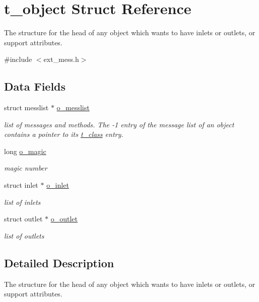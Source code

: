 \hypertarget{structt__object}{
\section{t\_\-object Struct Reference}
\label{structt__object}
}


The structure for the head of any object which wants to have inlets or outlets, or support attributes.  


{\ttfamily \#include $<$ext\_\-mess.h$>$}\subsection*{Data Fields}
\begin{DoxyCompactItemize}
\item 
\hypertarget{structt__object_a79f4251061edbe1b55db6fb8b572f2e0}{
struct messlist $\ast$ \hyperlink{structt__object_a79f4251061edbe1b55db6fb8b572f2e0}{o\_\-messlist}}
\label{structt__object_a79f4251061edbe1b55db6fb8b572f2e0}

\begin{DoxyCompactList}\small\item\em list of messages and methods. The -\/1 entry of the message list of an object contains a pointer to its \hyperlink{structt__class}{t\_\-class} entry. \item\end{DoxyCompactList}\item 
\hypertarget{structt__object_a268ef5e6ca203e3767531c74d1f3da60}{
long \hyperlink{structt__object_a268ef5e6ca203e3767531c74d1f3da60}{o\_\-magic}}
\label{structt__object_a268ef5e6ca203e3767531c74d1f3da60}

\begin{DoxyCompactList}\small\item\em magic number \item\end{DoxyCompactList}\item 
\hypertarget{structt__object_aa992ab915e7383768f2e0c661156634c}{
struct inlet $\ast$ \hyperlink{structt__object_aa992ab915e7383768f2e0c661156634c}{o\_\-inlet}}
\label{structt__object_aa992ab915e7383768f2e0c661156634c}

\begin{DoxyCompactList}\small\item\em list of inlets \item\end{DoxyCompactList}\item 
\hypertarget{structt__object_af63eed332b4b9921acc6b63051c9936f}{
struct outlet $\ast$ \hyperlink{structt__object_af63eed332b4b9921acc6b63051c9936f}{o\_\-outlet}}
\label{structt__object_af63eed332b4b9921acc6b63051c9936f}

\begin{DoxyCompactList}\small\item\em list of outlets \item\end{DoxyCompactList}\end{DoxyCompactItemize}


\subsection{Detailed Description}
The structure for the head of any object which wants to have inlets or outlets, or support attributes. 